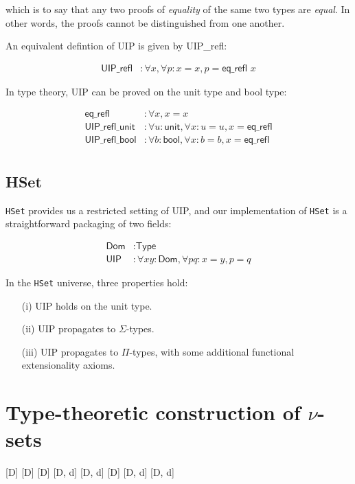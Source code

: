 \documentclass[10pt]{art.cls/art}
\begin{document}
which is to say that any two proofs of \emph{equality} of the same two types are \emph{equal}. In other words, the proofs cannot be distinguished from one another.

An equivalent defintion of UIP is given by \textsf{UIP\_refl}:

\begin{align*}
  \textsf{UIP\_refl} & : \forall x, \forall p : x = x, p = \textsf{eq\_refl } x
\end{align*}

In type theory, UIP can be proved on the unit type and bool type:

\begin{align*}
  \textsf{eq\_refl}        & : \forall x, x = x                                                    \\
  \textsf{UIP\_refl\_unit} & : \forall u : \textsf{unit}, \forall x : u = u, x = \textsf{eq\_refl} \\
  \textsf{UIP\_refl\_bool} & : \forall b : \textsf{bool}, \forall x : b = b, x = \textsf{eq\_refl} \\
\end{align*}

\subsection{HSet}
\texttt{HSet} provides us a restricted setting of UIP, and our implementation of \texttt{HSet} is a straightforward packaging of two fields:

\begin{align*}
  \textsf{Dom} & : \textsf{Type}                                          \\
  \textsf{UIP} & : \forall x y : \textsf{Dom}, \forall p q : x = y, p = q
\end{align*}

In the \texttt{HSet} universe, three properties hold:

\begin{enumerate}
  \item[(i)] UIP holds on the unit type.
  \item[(ii)] UIP propagates to $\Sigma$-types.
  \item[(iii)] UIP propagates to $\Pi$-types, with some additional functional extensionality axioms.
\end{enumerate}

\section{Type-theoretic construction of \texorpdfstring{$\nu$}{nu}-sets}
%
[D]
[D]
[D]
[D, d]
[D, d]
[D]
[D, d]
[D, d]
\end{document}
